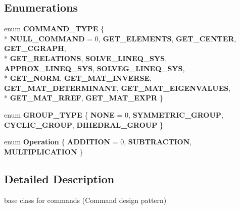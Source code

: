 \subsection*{Enumerations}
\begin{DoxyCompactItemize}
\item 
enum {\bfseries C\-O\-M\-M\-A\-N\-D\-\_\-\-T\-Y\-P\-E} \{ \\*
{\bfseries N\-U\-L\-L\-\_\-\-C\-O\-M\-M\-A\-N\-D} =  0, 
{\bfseries G\-E\-T\-\_\-\-E\-L\-E\-M\-E\-N\-T\-S}, 
{\bfseries G\-E\-T\-\_\-\-C\-E\-N\-T\-E\-R}, 
{\bfseries G\-E\-T\-\_\-\-C\-G\-R\-A\-P\-H}, 
\\*
{\bfseries G\-E\-T\-\_\-\-R\-E\-L\-A\-T\-I\-O\-N\-S}, 
{\bfseries S\-O\-L\-V\-E\-\_\-\-L\-I\-N\-E\-Q\-\_\-\-S\-Y\-S}, 
{\bfseries A\-P\-P\-R\-O\-X\-\_\-\-L\-I\-N\-E\-Q\-\_\-\-S\-Y\-S}, 
{\bfseries S\-O\-L\-V\-E\-G\-\_\-\-L\-I\-N\-E\-Q\-\_\-\-S\-Y\-S}, 
\\*
{\bfseries G\-E\-T\-\_\-\-N\-O\-R\-M}, 
{\bfseries G\-E\-T\-\_\-\-M\-A\-T\-\_\-\-I\-N\-V\-E\-R\-S\-E}, 
{\bfseries G\-E\-T\-\_\-\-M\-A\-T\-\_\-\-D\-E\-T\-E\-R\-M\-I\-N\-A\-N\-T}, 
{\bfseries G\-E\-T\-\_\-\-M\-A\-T\-\_\-\-E\-I\-G\-E\-N\-V\-A\-L\-U\-E\-S}, 
\\*
{\bfseries G\-E\-T\-\_\-\-M\-A\-T\-\_\-\-R\-R\-E\-F}, 
{\bfseries G\-E\-T\-\_\-\-M\-A\-T\-\_\-\-E\-X\-P\-R}
 \}
\item 
enum {\bfseries G\-R\-O\-U\-P\-\_\-\-T\-Y\-P\-E} \{ {\bfseries N\-O\-N\-E} =  0, 
{\bfseries S\-Y\-M\-M\-E\-T\-R\-I\-C\-\_\-\-G\-R\-O\-U\-P}, 
{\bfseries C\-Y\-C\-L\-I\-C\-\_\-\-G\-R\-O\-U\-P}, 
{\bfseries D\-I\-H\-E\-D\-R\-A\-L\-\_\-\-G\-R\-O\-U\-P}
 \}
\item 
enum {\bfseries Operation} \{ {\bfseries A\-D\-D\-I\-T\-I\-O\-N} =  0, 
{\bfseries S\-U\-B\-T\-R\-A\-C\-T\-I\-O\-N}, 
{\bfseries M\-U\-L\-T\-I\-P\-L\-I\-C\-A\-T\-I\-O\-N}
 \}
\end{DoxyCompactItemize}


\subsection{Detailed Description}
base class for commands (Command design pattern) 